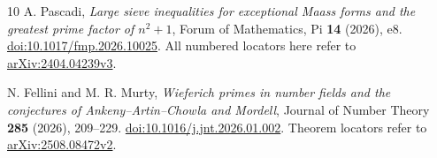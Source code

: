 \documentclass[11pt,a4paper]{article}
\theoremstyle{definition}\newtheorem{question}[theorem]{Question}
\theoremstyle{remark}\newtheorem{remark}[theorem]{Remark}
\begin{document}
\begin{thebibliography}{10}
A. Pascadi, \emph{Large sieve inequalities for exceptional Maass forms
and the greatest prime factor of $n^2+1$},
Forum of Mathematics, Pi \textbf{14} (2026), e8.
\href{https://doi.org/10.1017/fmp.2026.10025}{doi:10.1017/fmp.2026.10025}.
All numbered locators here refer to
\href{https://arxiv.org/abs/2404.04239v3}{arXiv:2404.04239v3}.

N. Fellini and M. R. Murty,
\emph{Wieferich primes in number fields and the conjectures of
Ankeny--Artin--Chowla and Mordell},
Journal of Number Theory \textbf{285} (2026), 209--229.
\href{https://doi.org/10.1016/j.jnt.2026.01.002}{doi:10.1016/j.jnt.2026.01.002}.
Theorem locators refer to
\href{https://arxiv.org/abs/2508.08472v2}{arXiv:2508.08472v2}.
\end{thebibliography}
\end{document}
